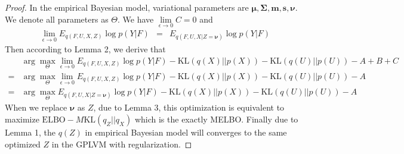 \begin{proof}
    In the empirical Bayesian model, variational parameters are $\bm \mu, \bm \Sigma, \bm m, \bm s, \bm \nu$. We denote all parameters as $\varTheta$. We have $\lim\limits_{\epsilon \rightarrow 0}C = 0$ and 
	\begin{eqnarray}
    \lim\limits_{\epsilon \rightarrow 0}E_{q(F, U, X, Z)}\log p(Y|F) & = & E_{q(F, U, X| Z = \bm \nu)}\log p(Y|F)
	\end{eqnarray}
	Then according to Lemma 2, we derive that
	\begin{eqnarray}
	& \arg\max\limits_{\varTheta}\lim\limits_{\epsilon \rightarrow 0} E_{q(F, U, X, Z)}\log p(Y|F) - \mathrm{KL}(q(X)||p(X)) - \mathrm{KL}(q(U)||p(U)) - A + B + C \nonumber \\
	= & 
	\arg\max\limits_{\varTheta}\lim\limits_{\epsilon\rightarrow 0} E_{q(F, U, X, Z)}\log p(Y|F) - \mathrm{KL}(q(X)||p(X)) - \mathrm{KL}(q(U)||p(U)) - A  \nonumber \\  
	= & \arg\max\limits_{\varTheta} E_{q(F, U, X| Z=\bm \nu)}\log p(Y|F) - \mathrm{KL}(q(X)|| p(X)) - \mathrm{KL}(q(U) ||p(U )) - A \nonumber 
	\end{eqnarray}
	When we replace $\bm \nu$ as $Z$, due to Lemma 3, this optimization is equivalent to maximize $\mathrm{ELBO} - M\mathrm{KL}(q_Z||q_X)$ which is the exactly MELBO. Finally due to Lemma 1, the $q(Z)$ in empirical Bayesian model will converges to the same optimized $Z$ in the GPLVM with regularization.
\end{proof}

